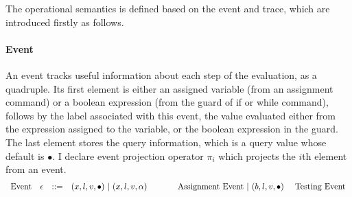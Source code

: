 The operational semantics is defined based on the event and trace, which are introduced firstly as follows.
\paragraph*{Event}
An event tracks useful information about each step of the evaluation, as a quadruple. Its first element is either 
an assigned variable (from an assignment command) or a boolean expression (from the guard of if or while command), follows by 
 the label associated with this event, the value evaluated either from the expression assigned to the variable,
or the boolean expression in the guard.
 The last element stores the query information, which is a query value whose default is $\bullet$. I declare event projection operator $\pi_i$ which projects the $i$th element from an event.
\[
\begin{array}{llll}
\mbox{Event} 
& \mathtt{\epsilon} & ::= & 
 ({x}, l, v, \bullet) ~|~ ({x}, l, v, \alpha) ~~~~~~~~~~~ \mbox{Assignment Event} 
~|~(b, l, v, \bullet) 
~~~~
\mbox{Testing Event}
\end{array}
\]
% 
